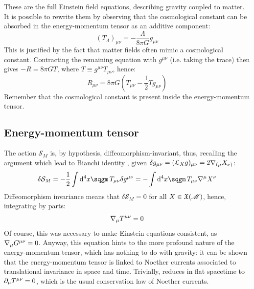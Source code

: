 These are the full Einstein field equations, describing gravity coupled to matter. It is possible to rewrite them by observing that the cosmological constant can be absorbed in the energy-momentum tensor as an additive component:
\begin{equation}
  (T_\Lambda)_{\mu \nu} = - \frac{\Lambda}{8\pi G} g_{\mu \nu}
  \label{eq:lambda-emt}
\end{equation}
This is justified by the fact that matter fields often mimic a cosmological constant. Contracting the remaining equation with $ g^{\mu \nu} $ (i.e. taking the trace) then gives $ -R = 8\pi G T $, where $ T \equiv g^{\mu \nu} T_{\mu \nu} $, hence:
\begin{equation}
  R_{\mu \nu} = 8\pi G \left( T_{\mu \nu} - \frac{1}{2} T g_{\mu \nu} \right)
  \label{eq:ef-eq-alt}
\end{equation}
Remember that the cosmological constant is present inside the energy-momentum tensor.

\subsection{Energy-momentum tensor}

The action $ \mathcal{S}_M $ is, by hypothesis, diffeomorphism-invariant, thus, recalling the argument which lead to Bianchi identity , given $ \delta g_{\mu \nu} = (\EuScript{L}_X g)_{\mu \nu} = 2 \nabla_{(\mu} X_{\nu)} $:
\begin{equation*}
  \delta \mathcal{S}_M = - \frac{1}{2} \int \dd^4 x \sqgm \, T_{\mu \nu} \delta g^{\mu \nu} = - \int \dd^4 x \sqgm \, T_{\mu \nu} \na^\mu X^\nu
\end{equation*}
Diffeomorphism invariance means that $ \delta \mathcal{S}_M = 0 $ for all $ X \in \mathfrak{X}(\mathscr{M}) $, hence, integrating by parts:
\begin{equation}
  \nabla_\mu T^{\mu \nu} = 0
  \label{eq:em-tens-cons}
\end{equation}
Of course, this was necessary to make Einstein equations consistent, as $ \nabla_\mu G^{\mu \nu} = 0 $. Anyway, this equation hints to the more profound nature of the energy-momentum tensor, which has nothing to do with gravity: it can be shown that the energy-momentum tensor is linked to Noether currents associated to translational invariance in space and time. Trivially,  reduces in flat spacetime to $ \partial_\mu T^{\mu \nu} = 0 $, which is the usual conservation law of Noether currents.

